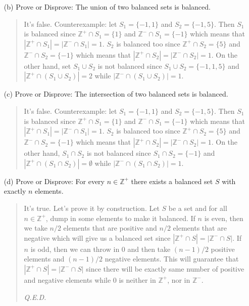 \documentclass[12pt, a4paper]{article}                      %
\begin{document}
\begin{itemize}
\begin{itemize}
\item[(b)]
Prove or Disprove: The union of two balanced sets is balanced.
\begin{quote}
It's false. Counterexample: let $S_1 = \{-1, 1\}$ and $S_2 = \{-1, 5\}$.
Then $S_1$ is balanced since $\mathbb{Z}^+ \cap S_1 = \{1\}$ and $\mathbb{Z}^- \cap S_1 = \{-1\}$ which
means that $|\mathbb{Z}^+ \cap S_1| = |\mathbb{Z}^- \cap S_1| = 1$. $S_2$ is balanced too since
$\mathbb{Z}^+ \cap S_2 = \{5\}$ and $\mathbb{Z}^- \cap S_2 = \{-1\}$ which means that
$|\mathbb{Z}^+ \cap S_2| = |\mathbb{Z}^- \cap S_2| = 1$. On the other hand, set $S_1 \cup S_2$ is not balanced
since $S_1 \cup S_2 = \{-1, 1, 5\}$ and $|\mathbb{Z}^+ \cap (S_1 \cup S_2)| = 2$ while $|\mathbb{Z}^- \cap (S_1 \cup S_2)| = 1$.
\end{quote}

\item[]

\item[(c)]
Prove or Disprove: The intersection of two balanced sets is balanced. 
\begin{quote}
It's false. Counterexample: let $S_1 = \{-1, 1\}$ and $S_2 = \{-1, 5\}$.
Then $S_1$ is balanced since $\mathbb{Z}^+ \cap S_1 = \{1\}$ and $\mathbb{Z}^- \cap S_1 = \{-1\}$ which
means that $|\mathbb{Z}^+ \cap S_1| = |\mathbb{Z}^- \cap S_1| = 1$. $S_2$ is balanced too since
$\mathbb{Z}^+ \cap S_2 = \{5\}$ and $\mathbb{Z}^- \cap S_2 = \{-1\}$ which means that
$|\mathbb{Z}^+ \cap S_2| = |\mathbb{Z}^- \cap S_2| = 1$. On the other hand, $S_1 \cap S_2$ is not balanced
since $S_1 \cap S_2 = \{-1\}$ and $|\mathbb{Z}^+ \cap (S_1 \cap S_2)| = \emptyset$ while $|\mathbb{Z}^- \cap (S_1 \cap S_2)| = 1$.
\end{quote}

\item[]

\item[(d)]
Prove or Disprove: For every $n \in \mathbb{Z}^+$ there exists a balanced set $S$ with exactly $n$ elements.
\begin{quote}
It's true. Let's prove it by construction. Let $S$ be a set and for all $n \in \mathbb{Z}^+$, dump in some elements to make it balanced.
If $n$ is even, then we take $n/2$ elements that are positive
and $n/2$ elements that are negative which will give us a balanced set since $|\mathbb{Z}^+ \cap S| = |\mathbb{Z}^- \cap S|$.
If $n$ is odd, then we can throw in $0$ and then take $(n - 1)/2$ positive elements and $(n - 1)/2$ negative elements.
This will guarantee that $|\mathbb{Z}^+ \cap S| = |\mathbb{Z}^- \cap S|$ since there will be exactly same number of positive and negative
elements while 0 is neither in $\mathbb{Z}^+$, nor in $\mathbb{Z}^-$.
\begin{flushright}
\textit{Q.E.D.}
\end{flushright}
\end{quote}


\end{itemize}
\end{itemize}
\end{document}
